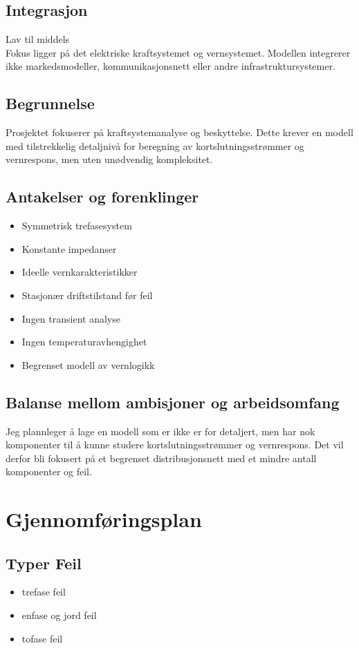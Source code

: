 \documentclass{article}
\begin{document}
\subsection{Integrasjon}
Lav til middels\\
Fokus ligger på det elektriske kraftsystemet og vernsystemet. Modellen integrerer ikke markedsmodeller, kommunikasjonsnett eller andre infrastruktursystemer.

\subsection{Begrunnelse}
Prosjektet fokuserer på kraftsystemanalyse og beskyttelse. Dette krever en modell med tilstrekkelig detaljnivå for beregning av kortslutningsstrømmer og vernrespons, men uten unødvendig kompleksitet.

\subsection{Antakelser og forenklinger}
\begin{itemize}
    \item Symmetrisk trefasesystem
    \item Konstante impedanser
    \item Ideelle vernkarakteristikker
    \item Stasjonær driftstilstand før feil
    \item Ingen transient analyse
    \item Ingen temperaturavhengighet
    \item Begrenset modell av vernlogikk
\end{itemize}

\subsection{Balanse mellom ambisjoner og arbeidsomfang}
Jeg plannleger å lage en modell som er ikke er for detaljert, men har nok komponenter til å kunne studere kortslutningsstrømmer og vernrespons. Det vil derfor bli fokusert på et begrenset distribusjonsnett med et mindre antall komponenter og feil.

\newpage
\section{Gjennomføringsplan}
\subsection{Typer Feil}
\begin{itemize}
    \item trefase feil
    \item enfase og jord feil
    \item tofase feil
\end{itemize}
\end{document}
